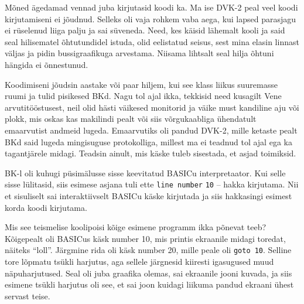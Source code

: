 
Mõned ägedamad vennad juba kirjutasid koodi ka. Ma ise DVK-2 peal veel koodi 
kirjutamiseni ei jõudnud. Selleks oli vaja 
rohkem vaba aega, kui lapsed parasjagu ei rüselenud 
liiga palju ja sai süveneda. Need, kes käisid 
lähemalt kooli ja said seal hilisematel õhtutundidel istuda, olid 
eelistatud seisus, sest mina elasin linnast väljas 
ja pidin bussigraafikuga arvestama. Niisama lihtsalt seal hilja õhtuni hängida 
ei õnnestunud. 

Koodimiseni jõudsin aastake või paar hiljem, kui see klass 
liikus suuremasse ruumi ja tulid pisikesed 
BKd. Nagu tol ajal ikka, tekkisid need kusagilt Vene 
arvutitööstusest, neil olid hästi väikesed monitorid ja väike 
must kandiline aju või plokk, mis oskas kas makilindi pealt 
või siis võrgukaabliga ühendatult emaarvutist andmeid lugeda. Emaarvutiks oli pandud DVK-2, mille 
ketaste pealt BKd said lugeda mingisuguse protokolliga, 
millest ma ei teadnud tol ajal ega ka tagantjärele midagi. Teadsin ainult, 
mis käske tuleb sisestada, et asjad toimiksid.

BK-l oli kuhugi püsimälusse sisse keevitatud 
BASICu interpretaator. Kui selle sisse lülitasid, siis 
esimese asjana tuli ette \verb|line number| \verb|10| -- hakka kirjutama. 
Nii et sisuliselt sai interaktiivselt BASICu käske kirjutada ja siis
hakkasingi esimest korda koodi kirjutama. 


Mis see teismelise koolipoisi kõige esimene programm ikka põnevat teeb? 
Kõigepealt oli BASICus käsk number 10, mis printis ekraanile midagi toredat, näiteks 
\enquote{loll}. Järgmine rida 
oli käsk number 20, mille peale oli \verb|goto 10|. Selline tore lõpmatu 
tsükli harjutus, aga sellele järgnesid kiiresti igasugused muud näpuharjutused. 
Seal oli juba graafika olemas, sai ekraanile jooni kuvada, ja siis esimene 
tsükli harjutus oli see, et sai joon kuidagi liikuma pandud ekraani ühest 
servast teise. 

